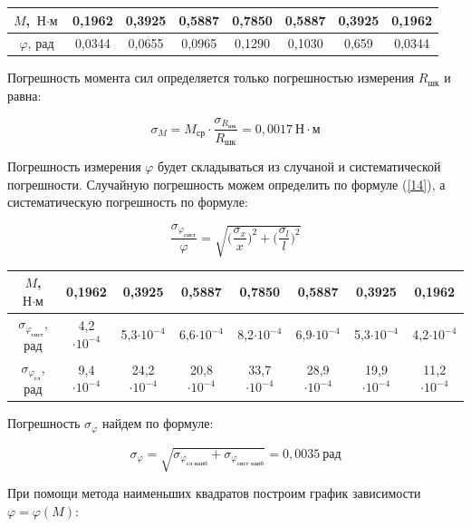 \documentclass[12pt,a4paper]{article}
\begin{document}
\begin{tabular}{|c|c|c|c|c|c|c|c|}
\hline
$M$, $\text{Н} \cdot \text{м}$ & 0,1962 & 0,3925 & 0,5887 & 0,7850 & 0,5887 & 0,3925 & 0,1962 \\
\hline
$\varphi$, рад& 0,0344 & 0,0655 & 0,0965 & 0,1290 & 0,1030 & 0,659 & 0,0344 \\
\hline
\end{tabular}

\vspace{0,5cm}

Погрешность момента сил определяется только погрешностью измерения $R_{\text{шк}}$ и равна:

\[\sigma_M = M_\text{ср}\cdot \frac{\sigma_{R_{\text{шк}}}}{R_{\text{шк}}} = 0,0017 \:\text{Н} \cdot \text{м}\]

Погрешность измерения $\varphi$ будет складываться из случаной и систематической погрешности. Случайную погрешность можем определить по формуле (\ref{14}), а систематическую погрешность по формуле:

\[\frac{\sigma_{\varphi_{\textit{сист}}}}{\varphi} = \sqrt{\Big( \frac{\sigma_x}{x}
\Big) ^2 + \Big( \frac{\sigma_l}{l} \Big) ^2}\]

\vspace{0,5cm}

\begin{tabular}{|c|c|c|c|c|c|c|c|}
\hline
$M$, $\text{Н} \cdot \text{м}$ & 0,1962 & 0,3925 & 0,5887 & 0,7850 & 0,5887 & 0,3925 & 0,1962 \\
\hline
$\sigma_{\varphi_{\textit{сист}}} $, рад& 4,2$\cdot 10^{-4}$ & 5,3$\cdot 10^{-4}$ & 6,6$\cdot 10^{-4}$ & 8,2$\cdot 10^{-4}$ & 6,9$\cdot 10^{-4}$ & 5,3$\cdot 10^{-4}$ & 4,2$\cdot 10^{-4}$ \\
\hline
$\sigma_{\varphi_{\textit{сл}}} $, рад& 9,4$\cdot 10^{-4}$ & 24,2$\cdot 10^{-4}$ & 20,8$\cdot 10^{-4}$ & 33,7$\cdot 10^{-4}$ & 28,9$\cdot 10^{-4}$ & 19,9$\cdot 10^{-4}$ & 11,2$\cdot 10^{-4}$ \\
\hline
\end{tabular}

\vspace{0,5cm}

Погрешность $\sigma_{\varphi}$ найдем по формуле:

\[\sigma_{\varphi} = \sqrt{\sigma_{\varphi_{\text{сл наиб}}} + \sigma_{\varphi_{\text{сист наиб}}}} = 0,0035 \:\text{рад}\]

При помощи метода наименьших квадратов построим график зависимости $\varphi = \varphi(\textit{M})$:
\end{document}
